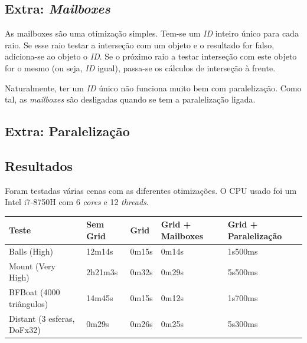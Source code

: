 \documentclass{article}
\begin{document}
        \subsection*{Extra: \textit{Mailboxes}}
            \par
            As mailboxes são uma otimização simples. Tem-se um \textit{ID} inteiro único para cada raio. Se esse raio testar a interseção com um objeto e o resultado for falso, adiciona-se ao objeto o \textit{ID}. Se o próximo raio a testar interseção com este objeto for o mesmo (ou seja, \textit{ID} igual), passa-se os cálculos de interseção à frente.
            \par
            Naturalmente, ter um \textit{ID} único não funciona muito bem com paralelização. Como tal, as \textit{mailboxes} são desligadas quando se tem a paralelização ligada.

        \subsection*{Extra: Paralelização}
            \par

        \subsection*{Resultados}
        Foram testadas várias cenas com as diferentes otimizações. O CPU usado foi um Intel i7-8750H com 6 \textit{cores} e 12 \textit{threads}.
        \begin{table}[h]
            \centering
            \begin{tabular}{|l|l|l|l|l|}
                \hline
                Teste                      & Sem Grid & Grid  & Grid + Mailboxes & Grid + Paralelização \\ \hline
                Balls (High)               & 12m14s   & 0m15s & 0m14s            & 1s500ms              \\ \hline
                Mount (Very High)          & 2h21m3s  & 0m32s & 0m29s            & 5s500ms              \\ \hline
                BFBoat (4000 triângulos)   & 14m45s   & 0m15s & 0m12s            & 1s700ms              \\ \hline
                Distant (3 esferas, DoFx32)& 0m29s    & 0m26s & 0m25s            & 5s300ms              \\ \hline
            \end{tabular}
        \end{table}
\end{document}
